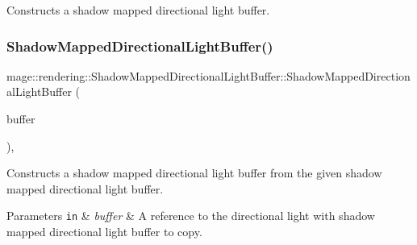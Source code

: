 Constructs a shadow mapped directional light buffer. \hypertarget{structmage_1_1rendering_1_1_shadow_mapped_directional_light_buffer_a984e2af2b6319226b6e896e28fc056b8}{}\label{structmage_1_1rendering_1_1_shadow_mapped_directional_light_buffer_a984e2af2b6319226b6e896e28fc056b8} 
\subsubsection{\texorpdfstring{Shadow\+Mapped\+Directional\+Light\+Buffer()}{ShadowMappedDirectionalLightBuffer()}\hspace{0.1cm}{\footnotesize\ttfamily [2/3]}}
{\footnotesize\ttfamily mage\+::rendering\+::\+Shadow\+Mapped\+Directional\+Light\+Buffer\+::\+Shadow\+Mapped\+Directional\+Light\+Buffer (\begin{DoxyParamCaption}\item[{const \hyperlink{structmage_1_1rendering_1_1_shadow_mapped_directional_light_buffer}{Shadow\+Mapped\+Directional\+Light\+Buffer} \&}]{buffer }\end{DoxyParamCaption})\hspace{0.3cm}{\ttfamily [default]}, {\ttfamily [noexcept]}}

Constructs a shadow mapped directional light buffer from the given shadow mapped directional light buffer.


\begin{DoxyParams}[1]{Parameters}
\mbox{\tt in}  & {\em buffer} & A reference to the directional light with shadow mapped directional light buffer to copy. \\
\hline
\end{DoxyParams}
\hypertarget{structmage_1_1rendering_1_1_shadow_mapped_directional_light_buffer_a35a9ceeb8616a77cf263769f0526db28}{}\label{structmage_1_1rendering_1_1_shadow_mapped_directional_light_buffer_a35a9ceeb8616a77cf263769f0526db28} 
